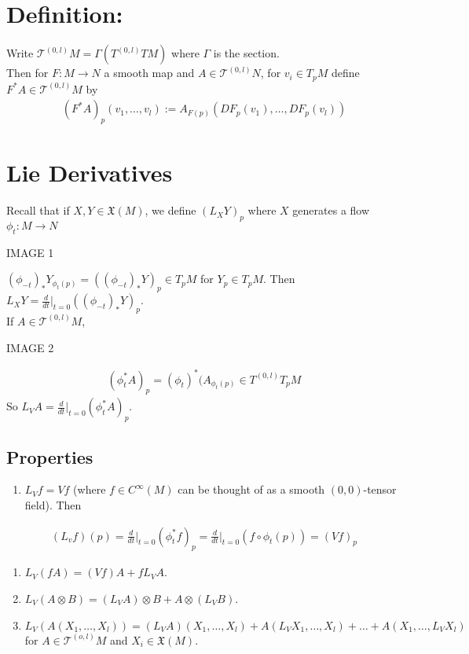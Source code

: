 \documentclass[11pt]{article}
\begin{document}
\section*{Definition:}
\label{sec:org861ac3b}
Write \(\mathcal{T}^{(0,l)}M=\Gamma(T^{(0,l)}TM)\) where \(\Gamma\) is the section.\\
Then for \(F:M\to N\) a smooth map and \(A\in \mathcal{T}^{(0,l)}N\), for \(v_{i}\in T_{p}M\) define \(F^{*}A\in\mathcal{T}^{(0,l)}M\) by\\
\begin{align*}
  (F^{*}A)_{p}(v_{1},\ldots,v_{l})
  :=A_{F(p)}(DF_{p}(v_{1}),\ldots,DF_{p}(v_{l}))
\end{align*}
\section*{Lie Derivatives}
\label{sec:org0e8e506}
Recall that if \(X,Y\in\mathfrak{X}(M)\), we define \((L_{X}Y)_{p}\) where \(X\) generates a flow \(\phi_{t}:M\to N\)\\
\begin{center}
IMAGE 1\\
\end{center}
\((\phi_{-t})_{*}Y_{\phi_{t}(p)}=((\phi_{-t})_{*}Y)_{p}\in T_{p}M\) for \(Y_{p}\in T_{p}M\). Then \(L_{X}Y=\frac{d}{dt}\Big|_{t=0}((\phi_{-t})_{*}Y)_{p}\).\\
If \(A\in\mathcal{T}^{(0,l)}M\),\\
\begin{center}
IMAGE 2\\
\end{center}
\begin{align*}
  (\phi^{*}_{t}A)_{p}=(\phi_{t})^{*}(A_{\phi_{t}(p)}\in T^{(0,l)}T_{p}M
\end{align*}
So \(L_{V}A=\frac{d}{dt}\Big|_{t=0}(\phi_{t}^{*}A)_{p}\).\\
\subsection*{Properties}
\label{sec:orga983ec5}
\begin{enumerate}
\item \(L_{V}f=Vf\) (where \(f\in C^{\infty}(M)\) can be thought of as a smooth \((0,0)\)-tensor field). Then\\
\end{enumerate}
\begin{align*}
  (L_{v}f)(p)
  =\frac{d}{dt}\Big|_{t=0}(\phi^{*}_{t}f)_{p}
  =\frac{d}{dt}\Big|_{t=0}(f\circ\phi_{t}(p))
  =(Vf)_{p}
\end{align*}
\begin{enumerate}
\item \(L_{V}(fA)=(Vf)A+fL_{V}A\).\\
\item \(L_{V}(A\otimes B)=(L_{V}A)\otimes B+A\otimes(L_{V}B)\).\\
\item \(L_{V}(A(X_{1},\ldots,X_{l}))=(L_{V}A)(X_{1},\ldots,X_{l})+A(L_{V}X_{1},\ldots,X_{l})+\ldots+A(X_{1},\ldots,L_{V}X_{l})\) for \(A\in\mathcal{T}^{(o,l)}M\) and \(X_{i}\in\mathfrak{X}(M)\).\\
\end{enumerate}
\end{document}
